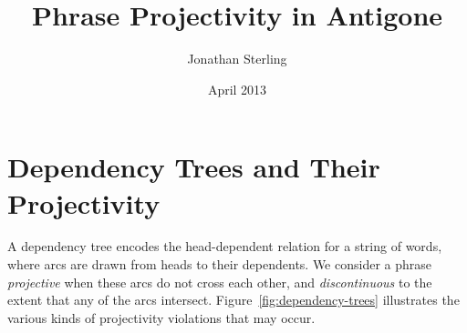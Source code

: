 \documentclass{article}
\newcommand{\Varid}[1]{\mathit{#1}}
\def\resethooks{%
  \global\let\SaveRestoreHook\empty
  \global\let\ColumnHook\empty}
\let\hspre\empty
\let\hspost\empty
\newcommand\VarId[1]{\mathord{\textcolor{VarId}{#1}}}
\let\Varid\VarId
\newcommand\VarSym[1]{\mathbin{\textcolor{VarSym}{#1}}}
\newcommand\Comment[1]{\textcolor{Comment}{\textit{\textsf{#1}}}}
\newcommand{\FN}{\mathsf}
\newcommand{\ignore}[1]{}
\begin{document}
\setmainfont{Times New Roman}

\author{Jonathan Sterling}

\title{Phrase Projectivity in Antigone}
\date{April 2013}
\maketitle

\ignore{
\begin{hscode}\SaveRestoreHook
\column{B}{@{}>{\hspre}l<{\hspost}@{}}%
\column{3}{@{}>{\hspre}l<{\hspost}@{}}%
\column{E}{@{}>{\hspre}l<{\hspost}@{}}%
\>[3]{}\Comment{\{-\#\enskip LANGUAGE StandaloneDeriving \enskip\#-\}}{}\<[E]%
\ColumnHook
\end{hscode}\resethooks
\begin{hscode}\SaveRestoreHook
\column{B}{@{}>{\hspre}l<{\hspost}@{}}%
\column{3}{@{}>{\hspre}l<{\hspost}@{}}%
\column{E}{@{}>{\hspre}l<{\hspost}@{}}%
\>[3]{}\mathkw{module}\;\mathsf{Analyze}\;\mathkw{where}{}\<[E]%
\\
\>[3]{}\mathkw{import}\;\mathsf{\mathsf{Control}.Applicative}{}\<[E]%
\\
\>[3]{}\mathkw{import}\;\mathsf{\mathsf{Control}.Arrow}\;((\VarSym{\&\&\&})){}\<[E]%
\\
\>[3]{}\mathkw{import}\;\mathsf{\mathsf{Data}.Foldable}{}\<[E]%
\\
\>[3]{}\mathkw{import}\;\mathsf{\mathsf{Debug}.Trace}{}\<[E]%
\\
\>[3]{}\mathkw{import}\;\mathsf{\mathsf{Data}.Maybe}\;(\Varid{isJust},\FN{maybeToList}){}\<[E]%
\\
\>[3]{}\mathkw{import}\;\mathsf{\mathsf{Data}.Tree}{}\<[E]%
\\
\>[3]{}\mathkw{import}\;\mathsf{\mathsf{Data}.List}\;(\FN{genericLength},\Varid{nub},\Varid{findIndex},\FN{sortBy}){}\<[E]%
\\
\>[3]{}\mathkw{import}\;\mathsf{\mathsf{Data}.Function}\;(\FN{on}){}\<[E]%
\\
\>[3]{}\mathkw{import}\;\mathsf{Prelude}\;\Varid{hiding}\;(\FN{maximum},\FN{minimum},\FN{foldl},\cdot \notin\cdot ,\Varid{elem},\FN{concat},\FN{sum}){}\<[E]%
\ColumnHook
\end{hscode}\resethooks
}

\section{Dependency Trees and Their Projectivity}

A dependency tree encodes the head-dependent relation for a string of words,
where arcs are drawn from heads to their dependents. We consider a phrase
\emph{projective} when these arcs do not cross each other, and
\emph{discontinuous} to the extent that any of the arcs intersect.
Figure~\ref{fig:dependency-trees} illustrates the various kinds of projectivity
violations that may occur.
\end{document}
